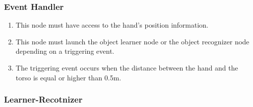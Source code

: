 		
	


 
\subsubsection{Event Handler}
   \begin{enumerate}[label=\textbf{FR\threedigits*}, leftmargin=2cm]
  \setcounter{enumi}{\value{saveenum}}
\item This node must have access to the hand's position information. 
\item This node must launch the object learner node or the object recognizer node depending on a triggering event. 
\item The triggering event occurs when the distance between the hand and the torso is equal or higher than 0.5m.   
    \setcounter{saveenum}{\value{enumi}}
\end{enumerate}



\subsubsection{Learner-Recotnizer}
